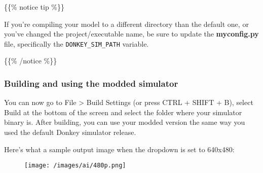 \documentclass[
]{article}
\begin{document}
\{\{\% notice tip \%\}\}

If you're compiling your model to a different directory than the default
one, or you've changed the project/executable name, be sure to update
the \textbf{myconfig.py} file, specifically the
\texttt{DONKEY\_SIM\_PATH} variable.

\{\{\% /notice \%\}\}

\hypertarget{header-n66}{%
\subsubsection{Building and using the modded
simulator}\label{header-n66}}

You can now go to File \textgreater{} Build Settings (or press CTRL +
SHIFT + B), select Build at the bottom of the screen and select the
folder where your simulator binary is. After building, you can use your
modded version the same way you used the default Donkey simulator
release.

Here's what a sample output image when the dropdown is set to 640x480:

\begin{figure}
\centering
\texttt{[image: /images/ai/480p.png]}
\caption{}
\end{figure}
\end{document}

